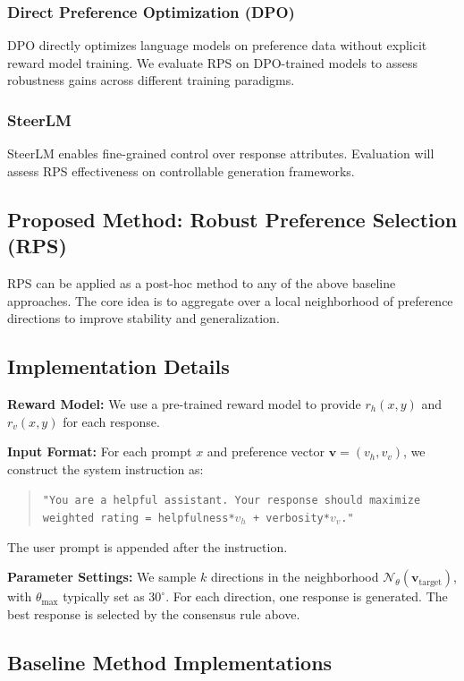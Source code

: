 \documentclass{article} %
\begin{document}
\subsubsection{Direct Preference Optimization (DPO)} 
DPO \cite{rafailov2024direct} directly optimizes language models on preference data without explicit reward model training. We evaluate RPS on DPO-trained models to assess robustness gains across different training paradigms.

\subsubsection{SteerLM}
SteerLM \cite{dong2023steerlm} enables fine-grained control over response attributes. Evaluation will assess RPS effectiveness on controllable generation frameworks.

\subsection{Proposed Method: Robust Preference Selection (RPS)}

RPS can be applied as a post-hoc method to any of the above baseline approaches. The core idea is to aggregate over a local neighborhood of preference directions to improve stability and generalization.

\subsection{Implementation Details}

\textbf{Reward Model:} We use a pre-trained reward model to provide $r_h(x, y)$ and $r_v(x, y)$ for each response.

\textbf{Input Format:} For each prompt $x$ and preference vector $\mathbf{v} = (v_h, v_v)$, we construct the system instruction as:
\begin{quote}
\texttt{"You are a helpful assistant. Your response should maximize weighted rating = helpfulness*$v_h$ + verbosity*$v_v$."}
\end{quote}
The user prompt is appended after the instruction.

\textbf{Parameter Settings:} We sample $k$ directions in the neighborhood $\mathcal{N}_\theta(\mathbf{v}_{\text{target}})$, with $\theta_{\max}$ typically set as $30^\circ$. For each direction, one response is generated. The best response is selected by the consensus rule above.

\subsection{Baseline Method Implementations}
\end{document}
